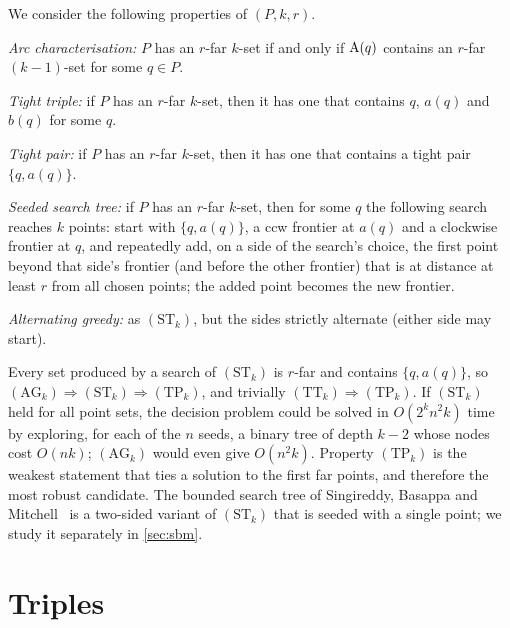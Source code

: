 We consider the following properties of $(P,k,r)$.
\begin{description}[leftmargin=3.2em,labelwidth=2.6em,itemsep=2pt]
\item[$(\mathrm{G}_k)$] \emph{Arc characterisation:} $P$ has an $r$-far $k$-set
if and only if $\mathrm{A}(q)$ contains an $r$-far $(k-1)$-set for some $q\in P$.
\item[$(\mathrm{TT}_k)$] \emph{Tight triple:} if $P$ has an $r$-far $k$-set,
then it has one that contains $q$, $a(q)$ and $b(q)$ for some $q$.
\item[$(\mathrm{TP}_k)$] \emph{Tight pair:} if $P$ has an $r$-far $k$-set, then
it has one that contains a tight pair $\{q,a(q)\}$.
\item[$(\mathrm{ST}_k)$] \emph{Seeded search tree:} if $P$ has an $r$-far $k$-set, then
for some $q$ the following search reaches $k$ points: start with
$\{q,a(q)\}$, a ccw frontier at $a(q)$ and a clockwise frontier at $q$, and
repeatedly add, on a side of the search's choice, the first point beyond that
side's frontier (and before the other frontier) that is at distance at least
$r$ from all chosen points; the added point becomes the new frontier.
\item[$(\mathrm{AG}_k)$] \emph{Alternating greedy:} as $(\mathrm{ST}_k)$, but
the sides strictly alternate (either side may start).
\end{description}
Every set produced by a search of $(\mathrm{ST}_k)$ is $r$-far and contains
$\{q,a(q)\}$, so
$(\mathrm{AG}_k)\Rightarrow(\mathrm{ST}_k)\Rightarrow(\mathrm{TP}_k)$, and
trivially $(\mathrm{TT}_k)\Rightarrow(\mathrm{TP}_k)$. If $(\mathrm{ST}_k)$ held
for all point sets, the decision problem could be solved in $O(2^kn^2k)$ time
by exploring, for each of the $n$ seeds, a binary tree of depth $k-2$ whose
nodes cost $O(nk)$; $(\mathrm{AG}_k)$ would even give $O(n^2k)$. Property
$(\mathrm{TP}_k)$ is the weakest statement that ties a solution to the first
far points, and therefore the most robust candidate. The bounded search tree
of Singireddy, Basappa and Mitchell~\citep{sbm} is a two-sided variant of
$(\mathrm{ST}_k)$ that is seeded with a single point; we study it separately
in \cref{sec:sbm}.

\section{Triples}\label{sec:k3}

